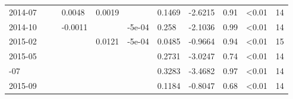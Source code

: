 \begin{table}
\begin{tabular}[t]{lllllllllll}
2014-07 &  &  & 0.0048 & 0.0019 &  & 0.1469 & -2.6215 & 0.91 & \textless0.01 & 14\\
2014-10 &  &  & -0.0011 &  & -5e-04 & 0.258 & -2.1036 & 0.99 & \textless0.01 & 14\\
2015-02 &  &  &  & 0.0121 & -5e-04 & 0.0485 & -0.9664 & 0.94 & \textless0.01 & 15\\
2015-05 &  &  &  &  &  & 0.2731 & -3.0247 & 0.74 & \textless0.01 & 14\\
\addlinespace
2015-07 &  &  &  &  &  & 0.3283 & -3.4682 & 0.97 & \textless0.01 & 14\\
2015-09 &  &  &  &  &  & 0.1184 & -0.8047 & 0.68 & \textless0.01 & 14\\
\bottomrule
\end{tabular}
\end{table}
